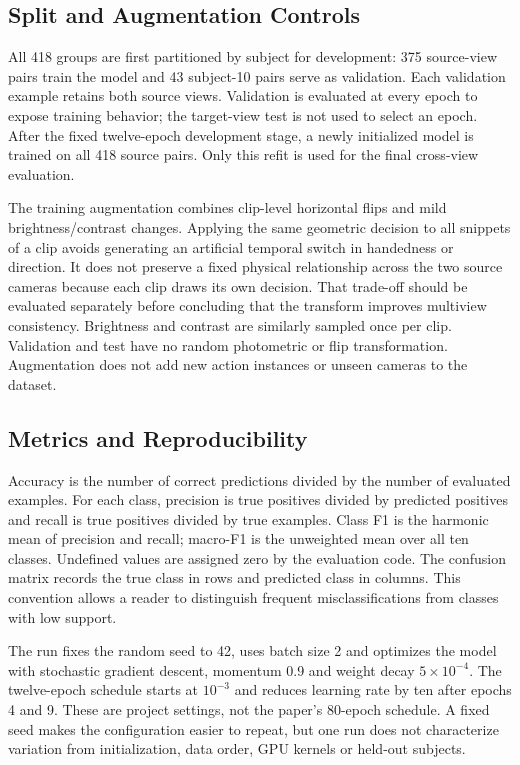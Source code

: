 \documentclass[runningheads]{llncs}
\begin{document}
\subsection{Split and Augmentation Controls}
All 418 groups are first partitioned by subject for development: 375 source-view pairs train the model and 43 subject-10 pairs serve as validation. Each validation example retains both source views. Validation is evaluated at every epoch to expose training behavior; the target-view test is not used to select an epoch. After the fixed twelve-epoch development stage, a newly initialized model is trained on all 418 source pairs. Only this refit is used for the final cross-view evaluation.

The training augmentation combines clip-level horizontal flips and mild brightness/contrast changes. Applying the same geometric decision to all snippets of a clip avoids generating an artificial temporal switch in handedness or direction. It does not preserve a fixed physical relationship across the two source cameras because each clip draws its own decision. That trade-off should be evaluated separately before concluding that the transform improves multiview consistency. Brightness and contrast are similarly sampled once per clip. Validation and test have no random photometric or flip transformation. Augmentation does not add new action instances or unseen cameras to the dataset.

\subsection{Metrics and Reproducibility}
Accuracy is the number of correct predictions divided by the number of evaluated examples. For each class, precision is true positives divided by predicted positives and recall is true positives divided by true examples. Class F1 is the harmonic mean of precision and recall; macro-F1 is the unweighted mean over all ten classes. Undefined values are assigned zero by the evaluation code. The confusion matrix records the true class in rows and predicted class in columns. This convention allows a reader to distinguish frequent misclassifications from classes with low support.

The run fixes the random seed to 42, uses batch size 2 and optimizes the model with stochastic gradient descent, momentum 0.9 and weight decay $5\times 10^{-4}$. The twelve-epoch schedule starts at $10^{-3}$ and reduces learning rate by ten after epochs 4 and 9. These are project settings, not the paper's 80-epoch schedule. A fixed seed makes the configuration easier to repeat, but one run does not characterize variation from initialization, data order, GPU kernels or held-out subjects.
\end{document}
